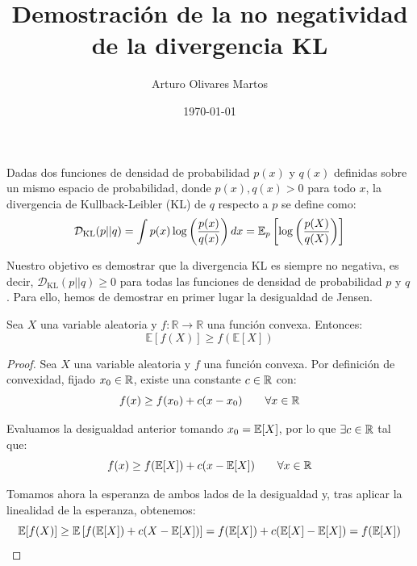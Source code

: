 \documentclass[12pt]{article}
\author{Arturo Olivares Martos}
\title{Demostración de la no negatividad de la divergencia KL}
\date{\today}
\begin{document}
\maketitle
\begin{definicion}
Dadas dos funciones de densidad de probabilidad $p(x)$ y $q(x)$ definidas sobre un mismo espacio de probabilidad, donde $p(x),q(x)>0$ para todo $x$, la divergencia de Kullback-Leibler (KL) de $q$ respecto a $p$ se define como:
\begin{equation}
\mathcal{D}_{\text{KL}}(p||q) = \int p(x) \log\left(\frac{p(x)}{q(x)}\right) dx = \mathbb{E}_p\left[\log\left(\frac{p(X)}{q(X)}\right)\right]
\end{equation}
\end{definicion}

Nuestro objetivo es demostrar que la divergencia KL es siempre no negativa, es decir, $\mathcal{D}_{\text{KL}}(p||q) \geq 0$ para todas las funciones de densidad de probabilidad $p$ y $q$. Para ello, hemos de demostrar en primer lugar la desigualdad de Jensen.
\begin{teo}
Sea $X$ una variable aleatoria y $f: \mathbb{R} \to \mathbb{R}$ una función convexa. Entonces:
\begin{equation}
\mathbb{E}[f(X)]\geq f(\mathbb{E}[X])
\end{equation}
\end{teo}
\begin{proof}
Sea $X$ una variable aleatoria y $f$ una función convexa. Por definición de convexidad, fijado $x_0\in \mathbb{R}$, existe una constante $c\in \mathbb{R}$ con:
\begin{equation*}
f(x) \geq f(x_0) + c(x - x_0)\qquad \forall x \in \mathbb{R}
\end{equation*}

Evaluamos la desigualdad anterior tomando $x_0=\mathbb{E}[X]$, por lo que $\exists c\in \mathbb{R}$ tal que:
\begin{equation*}
  f(x) \geq f(\mathbb{E}[X]) + c(x - \mathbb{E}[X])\qquad \forall x \in \mathbb{R}
\end{equation*}

Tomamos ahora la esperanza de ambos lados de la desigualdad y, tras aplicar la linealidad de la esperanza, obtenemos:
\begin{equation*}
\mathbb{E}[f(X)] \geq \mathbb{E}\left[f(\mathbb{E}[X]) + c(X - \mathbb{E}[X])\right] = f(\mathbb{E}[X]) + c(\mathbb{E}[X] - \mathbb{E}[X]) = f(\mathbb{E}[X])
\end{equation*}
\end{proof}
\end{document}
